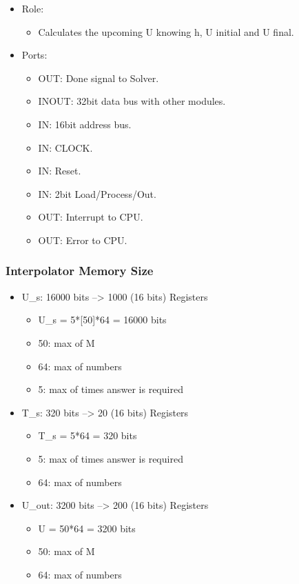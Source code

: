 \documentclass[12pt]{extarticle}
\begin{document}
\begin{itemize}
    \item Role:
    \begin{itemize}
        \item Calculates the upcoming U knowing h, U initial and U final.
    \end{itemize}
    \item Ports:
    \begin{itemize}
        \item OUT: Done signal to Solver.
        \item INOUT: 32bit data bus with other modules.
        \item IN: 16bit address bus.
        \item IN: CLOCK.
        \item IN: Reset.
        \item IN: 2bit Load/Process/Out.
        \item OUT: Interrupt to CPU.
        \item OUT: Error to CPU.
    \end{itemize}
\end{itemize}

\subsubsection{Interpolator Memory Size}
\begin{itemize}
    \item U\_s: 16000 bits --> 1000 (16 bits) Registers
    \begin{itemize}
        \item U\_s = 5*[50]*64 = 16000 bits
        \item 50: max of M
        \item 64: max of numbers
        \item 5: max of times answer is required
    \end{itemize}
    \item T\_s: 320 bits --> 20 (16 bits) Registers
    \begin{itemize}
        \item T\_s = 5*64 = 320 bits
        \item 5: max of times answer is required
        \item 64: max of numbers
    \end{itemize}
    \item U\_out: 3200 bits --> 200 (16 bits) Registers
    \begin{itemize}
        \item U = 50*64 = 3200 bits
        \item 50: max of M
        \item 64: max of numbers
    \end{itemize}
\end{itemize}
\end{document}
